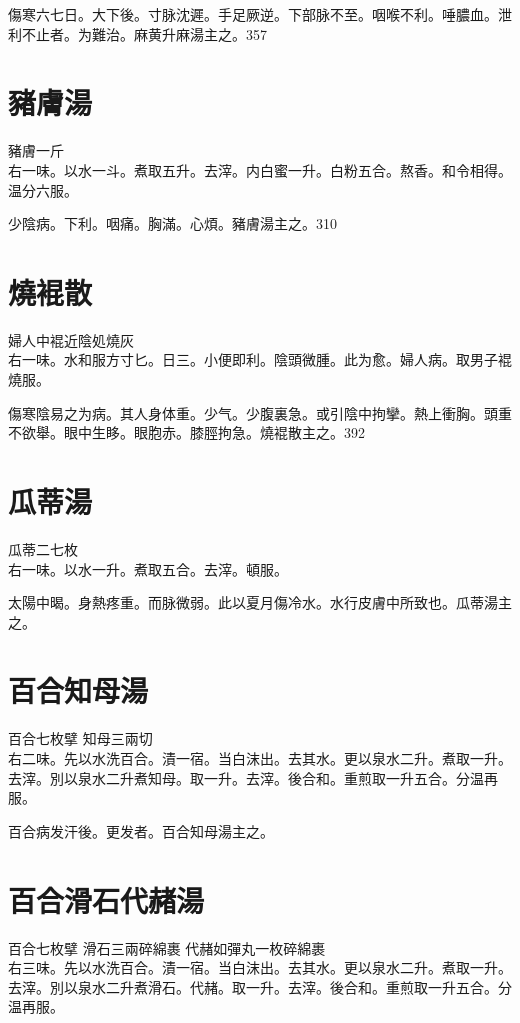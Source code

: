 傷寒六七日。大下後。{\khaaitp 寸}脉沈遲。手足厥逆。下部脉不至。咽喉不利。唾膿血。泄利不止者。为難治。麻黄升麻湯主之。357

\section{豬膚湯}

豬膚{\scriptsize 一斤}\\
右一味。以水一斗。煮取五升。去滓。内白蜜一升。白粉五合。熬香。和令相得。温分六服。

少陰病。下利。咽痛。胸滿。心煩。豬膚湯主之。310

\section{燒裩散}

婦人中裩近陰処燒灰\\
右一味。水和服方寸匕。日三。小便即利。陰頭微腫。此为愈。婦人病。取男子裩燒服。

傷寒陰易之为病。其人身体重。少气。少腹裏急。或引陰中拘攣。熱上衝胸。頭重不欲舉。眼中生眵。{\khaaitp 眼胞赤。}膝脛拘急。燒裩散主之。392

\section{瓜蒂湯}

瓜蒂{\scriptsize 二七枚}\\
右一味。以水一升。煮取五合。去滓。頓服。

太陽中暍。身熱疼重。而脉微弱。此以夏月傷冷水。水行皮膚中所致也。瓜蒂湯主之。

\section{百合知母湯}

百合{\scriptsize 七枚擘} 知母{\scriptsize 三兩切}\\
右二味。先以水洗百合。漬一宿。当白沫出。去其水。更以泉水二升。煮取一升。去滓。別以泉水二升煮知母。取一升。去滓。後合和。重煎取一升五合。分温再服。

百合病发汗後。更发者。百合知母湯主之。

\section{百合滑石代赭湯}

百合{\scriptsize 七枚擘} 滑石{\scriptsize 三兩碎綿裹} 代赭{\scriptsize 如彈丸一枚碎綿裹}\\
右三味。先以水洗百合。漬一宿。当白沫出。去其水。更以泉水二升。煮取一升。去滓。別以泉水二升煮滑石。代赭。取一升。去滓。後合和。重煎取一升五合。分温再服。

